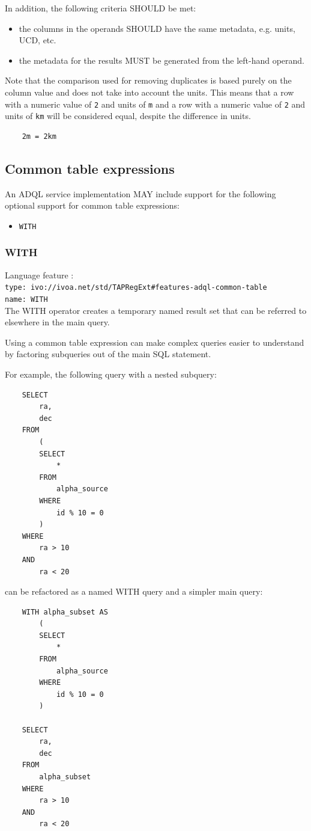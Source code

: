 \documentclass[11pt,a4paper]{ivoa}
\begin{document}
In addition, the following criteria SHOULD be met: 
\begin{itemize}
    \item the columns in the operands SHOULD have the same metadata, e.g. units, UCD, etc.
    \item the metadata for the results MUST be generated from the left-hand operand.
\end{itemize}

Note that the comparison used for removing duplicates is based purely on the
column value and does not take into account the units.
This means that a row with a numeric value of \verb:2: and units of \verb:m:
and a row with a numeric value of \verb:2: and units of \verb:km: will be
considered equal, despite the difference in units.
\begin{verbatim}
    2m = 2km
\end{verbatim}

\subsection{Common table expressions}
\label{sec:common-table}

An ADQL service implementation MAY include support for the following optional
support for common table expressions:

\begin{itemize}
    \item \verb:WITH:
\end{itemize}

\subsubsection{WITH}
{\footnotesize Language feature :}\\
{\footnotesize \verb|type: ivo://ivoa.net/std/TAPRegExt#features-adql-common-table|}\\
{\footnotesize \verb|name: WITH|}\\

The WITH operator creates a temporary named result set that can be referred
to elsewhere in the main query.

Using a common table expression can make complex queries easier to understand
by factoring subqueries out of the main SQL statement.

For example, the following query with a nested subquery: 
\begin{verbatim}
    SELECT
        ra,
        dec
    FROM
        (
        SELECT
            *
        FROM
            alpha_source
        WHERE
            id % 10 = 0
        )
    WHERE
        ra > 10
    AND 
        ra < 20
\end{verbatim}
\noindent
can be refactored as a named WITH query and a simpler main query:
\begin{verbatim}
    WITH alpha_subset AS
        (
        SELECT
            *
        FROM
            alpha_source
        WHERE
            id % 10 = 0
        )

    SELECT
        ra,
        dec
    FROM
        alpha_subset
    WHERE
        ra > 10
    AND 
        ra < 20
\end{verbatim}
\end{document}
